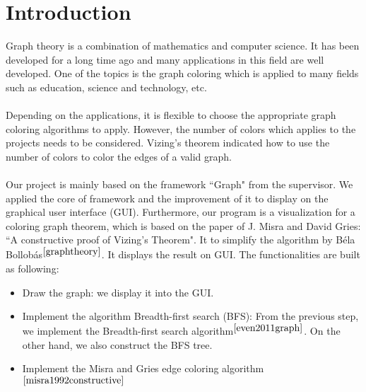 \section{Introduction}
{\label{intro}}
Graph theory is a combination of mathematics and computer science. It has been developed for a long time ago and many applications in this field are well developed. One of the topics is the graph coloring which is applied to many fields such as education, science and technology, etc.\\\\
Depending on the applications, it is flexible to choose the appropriate graph coloring algorithms to apply. However, the number of colors which applies to the projects needs to be considered. Vizing's theorem indicated how to use the number of colors to color the edges of a valid graph.\\\\
Our project is mainly based on the framework ``Graph" from the supervisor. We applied the core of framework and the improvement of it to display on the graphical user interface (GUI). Furthermore, our program is a visualization for a coloring graph theorem, which is based on the paper of J. Misra and David Gries: ``A constructive proof of Vizing's Theorem". It to simplify the algorithm by B{\'e}la Bollob{\'a}s$^{\cite{graphtheory}}$. It displays the result on GUI. The functionalities are built as following:
\begin{itemize}
\item Draw the graph: we display it into the GUI.
\item Implement the algorithm Breadth-first search (BFS): From the previous step, we implement the Breadth-first search algorithm$^{\cite{even2011graph}}$. On the other hand, we also construct the BFS tree.
\item Implement the Misra and Gries edge coloring algorithm $^{\cite{misra1992constructive}}$
\end{itemize}
